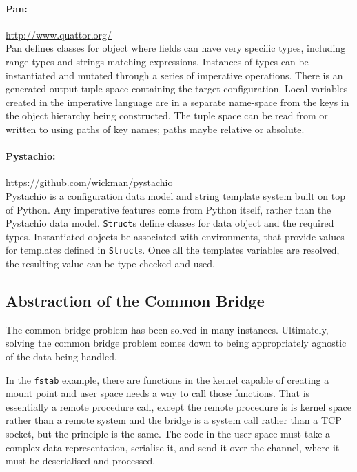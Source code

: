 \documentclass[letterpaper,twocolumn,10pt]{article}
\begin{document}
\paragraph{Pan:} \url{http://www.quattor.org/} \\

\noindent Pan defines classes for object where fields can have very specific types, including range types and strings matching expressions. Instances of types can be instantiated and mutated through a series of imperative operations. There is an generated output tuple-space containing the target configuration. Local variables created in the imperative language are in a separate name-space from the keys in the object hierarchy being constructed. The tuple space can be read from or written to using paths of key names; paths maybe relative or absolute.

\paragraph{Pystachio:} \url{https://github.com/wickman/pystachio} \\

\noindent Pystachio is a configuration data model and string template system built on top of Python. Any imperative features come from Python itself, rather than the Pystachio data model. \texttt{Struct}s define classes for data object and the required types. Instantiated objects be associated with environments, that provide values for templates defined in \texttt{Struct}s. Once all the templates variables are resolved, the resulting value can be type checked and used.


\subsection{Abstraction of the Common Bridge}
The common bridge problem has been solved in many instances. Ultimately, solving the common bridge problem comes down to being appropriately agnostic of the data being handled.

In the \texttt{fstab} example, there are functions in the kernel capable of creating a mount point and user space needs a way to call those functions. That is essentially a remote procedure call, except the remote procedure is is kernel space rather than a remote system and the bridge is a system call rather than a TCP socket, but the principle is the same. The code in the user space must take a complex data representation, serialise it, and send it over the channel, where it must be deserialised and processed.
\end{document}
